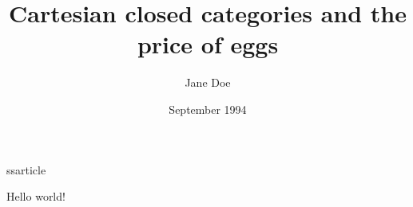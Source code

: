 ss{article}
\title{Cartesian closed categories and the price of eggs}
\author{Jane Doe}
\date{September 1994}

   \maketitle
	    Hello world!
			
